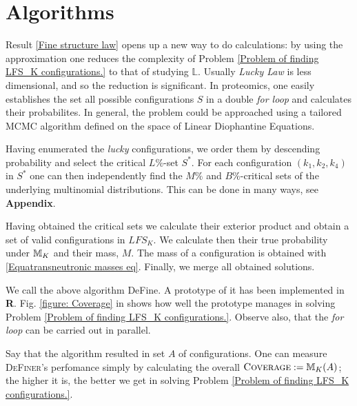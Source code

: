\section{Algorithms}

Result \ref{Fine structure law} opens up a new way to do calculations: by using the approximation one reduces the complexity of Problem \ref{Problem of finding LFS_K configurations.} to that of studying $\mathbb{L}$. Usually {\it Lucky Law} is less dimensional, and so the reduction is significant. In proteomics, one easily establishes the set all possible configurations $S$ in a double {\it for loop} and calculates their probabilites. In general, the problem could be approached using a tailored MCMC algorithm defined on the space of Linear Diophantine Equations.   
	
Having enumerated the {\it lucky} configurations, we order them by descending probability and select the critical $L\%$-set $S^*$. For each configuration $(k_1, k_2, k_4)$ in $S^*$ one can then independently find the $M\%$ and $B\%$-critical sets of the underlying multinomial distributions. This can be done in many ways, see \textbf{Appendix}.


Having obtained the critical sets we calculate their exterior product and obtain a set of valid configurations in $LFS_K$. We calculate then their true probability under $\mathbb{M}_K$ and their mass, $M$. The mass of a configuration is obtained with \eqref{Equatransneutronic masses eq}.  Finally, we merge all obtained solutions.

We call the above algorithm {\sc DeFine}. A prototype of it has been implemented in \textbf{R}.	Fig. \ref{figure: Coverage} in  shows how well the prototype manages in solving Problem \ref{Problem of finding LFS_K configurations.}. Observe also, that the {\it for loop} can be carried out in parallel.

Say that the algorithm resulted in set $A$ of configurations. One can measure \textsc{DeFiner}'s perfomance simply by calculating the overall $\textsc{Coverage} := \mathbb{M}_K(A)$; the higher it is, the better we get in solving Problem \ref{Problem of finding LFS_K configurations.}.



